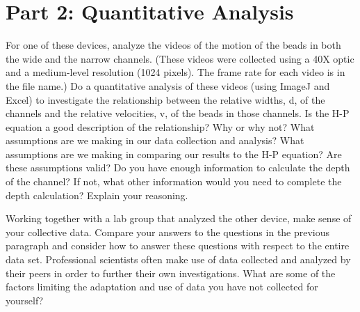 \section*{Part 2: Quantitative Analysis}
For one of these devices, analyze the videos of the motion of the beads in both the wide and
the narrow channels.
(These videos were collected using a 40X optic and a medium-level resolution (1024 pixels).
The frame rate for each video is in the file name.)
Do a quantitative analysis of these videos (using ImageJ and Excel) to investigate the relationship between the relative widths, d, of the channels and the relative velocities, v, of the beads in those channels.
Is the H-P equation a good description of the relationship?
Why or why not?
What assumptions are we making in our data collection and analysis?
What assumptions are we making in comparing our results to the H-P equation?
Are these assumptions valid?
Do you have enough information to calculate the depth of the channel?
If not, what other information would you need to complete the depth calculation?
Explain your reasoning.
\par
Working together with a lab group that analyzed the other device, make sense of your collective data.
Compare your answers to the questions in the previous paragraph and consider how to answer these questions with respect to the entire data set.
Professional scientists often make use of data collected and analyzed by their peers in order to further their own investigations.
What are some of the factors limiting the adaptation and use of data you have not collected for yourself?